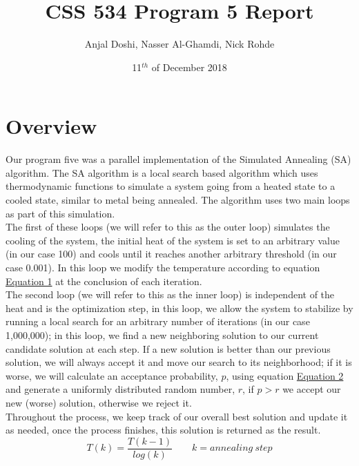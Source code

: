 \documentclass{article}
\author{Anjal Doshi, Nasser Al-Ghamdi, Nick Rohde}
\title{CSS 534 Program 5 Report}
\date{11$^{th}$ of December 2018}
\begin{document}
\maketitle
\tableofcontents
\pagebreak
	
	\section{Overview} \label{OVERVIEW}
		Our program five was a parallel implementation of the Simulated Annealing (SA) algorithm. The SA algorithm is a local search based algorithm which uses thermodynamic functions to simulate a system going from a heated state to a cooled state, similar to metal being annealed. The algorithm uses two main loops as part of this simulation. \\
		
		The first of these loops (we will refer to this as the outer loop) simulates the cooling of the system, the initial heat of the system is set to an arbitrary value (in our case 100) and cools until it reaches another arbitrary threshold (in our case 0.001). In this loop we modify the temperature according to equation \hyperref[E_TEMP]{Equation 1} at the conclusion of each iteration. \\
		
		The second loop (we will refer to this as the inner loop) is independent of the heat and is the optimization step, in this loop, we allow the system to stabilize by running a local search for an arbitrary number of iterations (in our case 1,000,000); in this loop, we find a new neighboring solution to our current candidate solution at each step. If a new solution is better than our previous solution, we will always accept it and move our search to its neighborhood; if it is worse, we will calculate an acceptance probability, $p$, using equation \hyperref[E_AP]{Equation 2} and generate a uniformly distributed random number, $r$, if $p > r$ we accept our new (worse) solution, otherwise we reject it. \\
		
		Throughout the process, we keep track of our overall best solution and update it as needed, once the process finishes, this solution is returned as the result.\\
		
		\begin{equation}\label{E_TEMP}
			T(k) = \frac{T(k-1)}{log(k)} \qquad k = annealing~step
		\end{equation}
\end{document}

